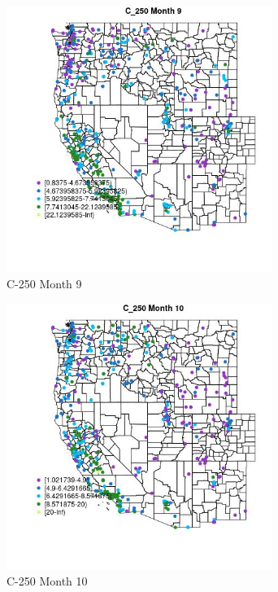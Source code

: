 \begin{figure} 
\centering  
\includegraphics[width=0.77\textwidth]{Code_Outputs/ML_input_report_ML_input_PM25_Step5_part_d_de_duplicated_aves_ML_input_MapObsMo9C_250.jpg} 
\caption{\label{fig:ML_input_report_ML_input_PM25_Step5_part_d_de_duplicated_aves_ML_inputMapObsMo9C_250}C-250 Month 9} 
\end{figure} 
 

\clearpage 

\begin{figure} 
\centering  
\includegraphics[width=0.77\textwidth]{Code_Outputs/ML_input_report_ML_input_PM25_Step5_part_d_de_duplicated_aves_ML_input_MapObsMo10C_250.jpg} 
\caption{\label{fig:ML_input_report_ML_input_PM25_Step5_part_d_de_duplicated_aves_ML_inputMapObsMo10C_250}C-250 Month 10} 
\end{figure} 
 

